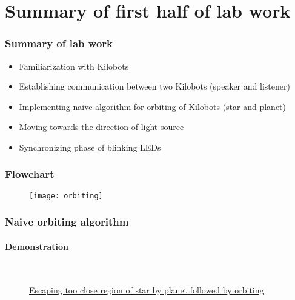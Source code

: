 \section{Summary of first half of lab work}
\begin{frame}
    \frametitle{Summary of lab work}
    \begin{itemize}
        \item Familiarization with Kilobots
        \item Establishing communication between two Kilobots (speaker and listener)
        \item Implementing naive algorithm for orbiting of Kilobots (star and planet)
        \item Moving towards the direction of light source
        \item Synchronizing phase of blinking LEDs
    \end{itemize}
\end{frame}

\begin{frame}
\frametitle{Flowchart}
\begin{figure}[H]
	\centering
	\texttt{[image: orbiting]}
\end{figure}
\end{frame}

\begin{frame}
\frametitle{Naive orbiting algorithm}
\framesubtitle{Demonstration}
\begin{figure}[H]
	\begin{center}
		\\
		\vspace{0.4cm}
		\caption{\href{https://photos.app.goo.gl/xPYoywncwhCk585X8}{Escaping too close region of star by planet followed by orbiting}}
		\label{fig:shape_formation_demo}
	\end{center}
\end{figure}
\end{frame}